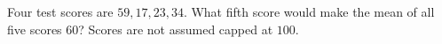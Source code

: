 Four test scores are $59,17,23,34$. What fifth score would make the mean of all five scores $60$? Scores are not assumed capped at $100$.
